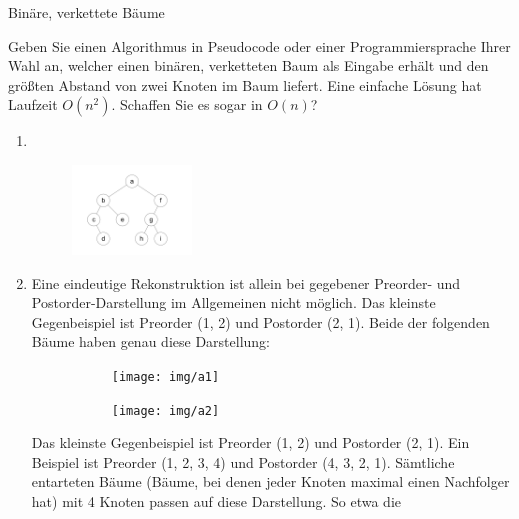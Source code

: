 \documentclass[11pt,a4paper]{article}
\begin{document}
\begin{aufgabe}{1}{Binäre, verkettete Bäume}
\begin{enumerate}
        Geben Sie einen Algorithmus in Pseudocode oder einer Programmiersprache Ihrer Wahl an, welcher einen binären, verketteten Baum als Eingabe erhält und den größten Abstand von zwei Knoten im Baum liefert.
        Eine einfache Lösung hat Laufzeit $O(n^2)$.
        Schaffen Sie es sogar in $O(n)$?
    \end{enumerate}
\end{aufgabe}
\begin{loesung}
    \begin{enumerate}
        \item \ \\
        \begin{figure}[h!]
            \centering
            \includegraphics[width=0.3\textwidth]{img/1a}
        \end{figure}
        \FloatBarrier
        \item Eine eindeutige Rekonstruktion ist allein bei gegebener Preorder- und Postorder-Darstellung im Allgemeinen nicht möglich.
        Das kleinste Gegenbeispiel ist Preorder (1, 2) und Postorder (2, 1).
        Beide der folgenden Bäume haben genau diese Darstellung:
        \begin{figure}[h!]
            \centering
            \begin{subfigure}[b]{0.23\textwidth}
                \centering
                \texttt{[image: img/a1]}
            \end{subfigure}
            \begin{subfigure}[b]{0.23\textwidth}
                \centering
                \texttt{[image: img/a2]}
            \end{subfigure}
        \end{figure}
        \FloatBarrier
        Das kleinste Gegenbeispiel ist Preorder (1, 2) und Postorder (2, 1).
        Ein Beispiel ist Preorder (1, 2, 3, 4) und Postorder (4, 3, 2, 1).
        Sämtliche entarteten Bäume (Bäume, bei denen jeder Knoten maximal einen Nachfolger hat) mit 4 Knoten passen auf diese Darstellung.
        So etwa die 
    \end{enumerate}
\end{loesung}
\end{document}
